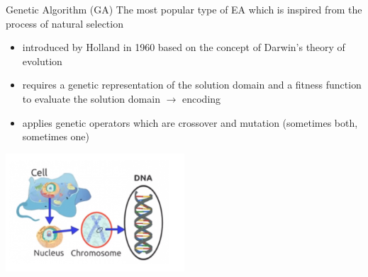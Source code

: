 \begin{frame}{Genetic Algorithm (GA) }
The most popular type of EA which is inspired from the process of natural selection
\begin{itemize}
    \item introduced by Holland in 1960 based on the concept of Darwin's theory of evolution
    \item requires a genetic representation of the solution domain and a fitness function to evaluate the solution domain $\rightarrow$ encoding 
    \item applies genetic operators which are crossover and mutation (sometimes both, sometimes one)
\end{itemize}
\begin{center}
\includegraphics[width=0.5\textwidth]{new_images/GA_0.png}    
\end{center}

\end{frame}

